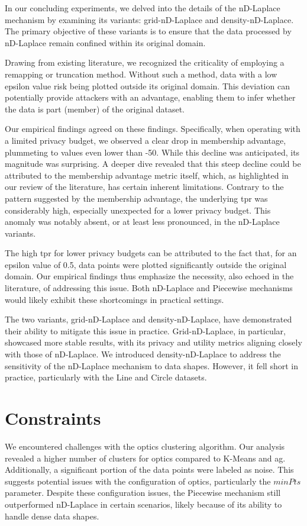 In our concluding experiments, we delved into the details of the nD-Laplace mechanism by examining its variants: grid-nD-Laplace and density-nD-Laplace. The primary objective of these variants is to ensure that the data processed by nD-Laplace remain confined within its original domain.

Drawing from existing literature, we recognized the criticality of employing a remapping or truncation method. Without such a method, data with a low epsilon value risk being plotted outside its original domain. This deviation can potentially provide attackers with an advantage, enabling them to infer whether the data is part (member) of the original dataset.

Our empirical findings agreed on these findings. Specifically, when operating with a limited privacy budget, we observed a clear drop in membership advantage, plummeting to values even lower than -50. While this decline was anticipated, its magnitude was surprising. A deeper dive revealed that this steep decline could be attributed to the membership advantage metric itself, which, as highlighted in our review of the literature, has certain inherent limitations. Contrary to the pattern suggested by the membership advantage, the underlying \gls{tpr} was considerably high, especially unexpected for a lower privacy budget. This anomaly was notably absent, or at least less pronounced, in the nD-Laplace variants. 

The high \gls{tpr} for lower privacy budgets can be attributed to the fact that, for an epsilon value of 0.5, data points were plotted significantly outside the original domain. Our empirical findings thus emphasize the necessity, also echoed in the literature, of addressing this issue. Both nD-Laplace and Piecewise mechanisms would likely exhibit these shortcomings in practical settings.

The two variants, grid-nD-Laplace and density-nD-Laplace, have demonstrated their ability to mitigate this issue in practice. Grid-nD-Laplace, in particular, showcased more stable results, with its privacy and utility metrics aligning closely with those of nD-Laplace. We introduced density-nD-Laplace to address the sensitivity of the nD-Laplace mechanism to data shapes. However, it fell short in practice, particularly with the Line and Circle datasets.

\section{Constraints}
We encountered challenges with the \gls{optics} clustering algorithm.
Our analysis revealed a higher number of clusters for \gls{optics} compared to K-Means and \gls{ag}. Additionally, a significant portion of the data points were labeled as noise. This suggests potential issues with the configuration of \gls{optics}, particularly the $minPts$ parameter. Despite these configuration issues, the Piecewise mechanism still outperformed nD-Laplace in certain scenarios, likely because of its ability to handle dense data shapes.
